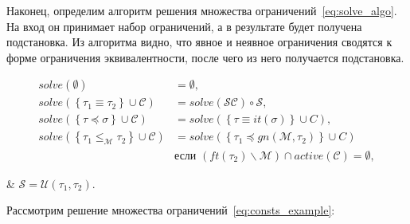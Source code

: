 Наконец, определим алгоритм решения множества ограничений~\eqref{eq:solve_algo}.
На вход он принимает набор ограничений, а в результате будет получена подстановка.
Из алгоритма видно, что явное и неявное ограничения сводятся к форме ограничения эквивалентности, после чего из него получается подстановка.

\begin{equation}
    \label{eq:solve_algo}
    \begin{aligned}
        solve(\emptyset) &= \emptyset, \\
        solve(\left\{ \tau_1 \equiv \tau_2 \right\} \cup \mathcal{C}) &= solve(\mathcal{S} \mathcal{C}) \circ \mathcal{S}, \\
        solve(\left\{ \tau \preceq \sigma \right\} \cup \mathcal{C}) &= solve(\left\{ \tau \equiv it(\sigma) \right\} \cup C), \\
        solve(\left\{ \tau_1 \leq_{\mathcal{M}} \tau_2 \right\} \cup \mathcal{C}) &= solve(\left\{ \tau_1 \preceq gn(\mathcal{M}, \tau_2) \right\} \cup C) \\
        &\text{если } (ft(\tau_2) \backslash \mathcal{M}) \cap active(\mathcal{C}) = \emptyset,
    \end{aligned}
\end{equation}
\begin{eqrem}
    & $\mathcal{S} = \mathcal{U}(\tau_1, \tau_2)$.\\
\end{eqrem}

Рассмотрим решение множества ограничений~\ref{eq:consts_example}:

